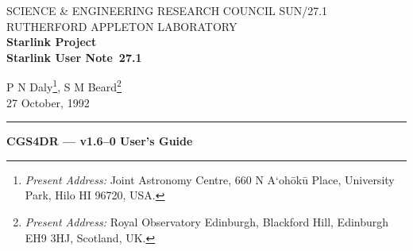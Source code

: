 \pagestyle{myheadings}

\newcommand{\stardoccategory}  {Starlink User Note}
\newcommand{\stardocinitials}  {SUN}
\newcommand{\stardocnumber}    {27.1}
\newcommand{\stardocauthor}    {P N Daly}
\newcommand{\stardoccoauthor}  {S M Beard}
\newcommand{\stardocdate}      {27 October, 1992}
\newcommand{\stardoctitle}     {CGS4DR --- v1.6--0 User's Guide}

\newcommand{\stardocname}{\stardocinitials /\stardocnumber}
\renewcommand{\_}{{\tt\char'137}}     %
\markright{\stardocname}
\setlength{\textwidth}{160mm}
\setlength{\textheight}{230mm}
\setlength{\topmargin}{-2mm}
\setlength{\oddsidemargin}{0mm}
\setlength{\evensidemargin}{0mm}
\setlength{\parindent}{0mm}
\setlength{\parskip}{\medskipamount}
\setlength{\unitlength}{1mm}

\newcommand{\tick}{$\surd$}
\newcommand{\cross}{$\times$}
\newcommand{\opt}{{\sf option}}


\thispagestyle{empty}
SCIENCE \& ENGINEERING RESEARCH COUNCIL \hfill \stardocname\\
RUTHERFORD APPLETON LABORATORY\\
{\large\bf Starlink Project\\}
{\large\bf \stardoccategory\ \stardocnumber}
\begin{flushright}
\stardocauthor\footnote{{\em Present Address:} 
 {\sf Joint Astronomy Centre, 660 N A`oh\={o}k\={u} Place, University Park,
  Hilo HI 96720, USA.}}, \stardoccoauthor\footnote{{\em Present Address:} 
 {\sf Royal Observatory Edinburgh, Blackford Hill, Edinburgh EH9 3HJ, 
  Scotland, UK.}} \\
\stardocdate
\end{flushright}
\vspace{-4mm}
\rule{\textwidth}{0.5mm}
\vspace{5mm}
\begin{center}
{\Large\bf \stardoctitle}
\end{center}
\vspace{5mm}

  \setlength{\parskip}{0mm}
  \tableofcontents
  \setlength{\parskip}{\medskipamount}

